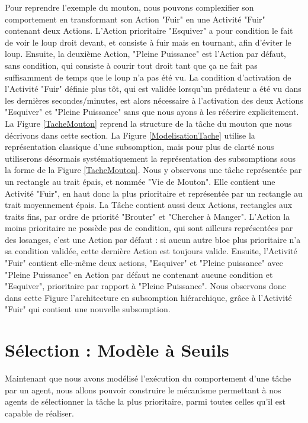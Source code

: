 			Pour reprendre l'exemple du mouton, nous pouvons complexifier son comportement en transformant son Action "Fuir" en une Activité "Fuir" contenant deux Actions. L'Action prioritaire "Esquiver" a pour condition le fait de voir le loup droit devant, et consiste à fuir mais en tournant, afin d'éviter le loup. Ensuite, la deuxième Action, "Pleine Puissance" est l'Action par défaut, sans condition, qui consiste à courir tout droit tant que ça ne fait pas suffisamment de temps que le loup n'a pas été vu. La condition d'activation de l'Activité "Fuir" définie plus tôt, qui est validée lorsqu'un prédateur a été vu dans les dernières secondes/minutes, est alors nécessaire à l'activation des deux Actions "Esquiver" et "Pleine Puissance" sans que nous ayons à les réécrire explicitement. La Figure \ref{TacheMouton} reprend la structure de la tâche du mouton que nous décrivons dans cette section. La Figure \ref{ModelisationTache} utilise la représentation classique d'une subsomption, mais pour plus de clarté nous utiliserons désormais systématiquement la représentation des subsomptions sous la forme de la Figure \ref{TacheMouton}. Nous y observons une tâche représentée par un rectangle au trait épais, et nommée "Vie de Mouton". Elle contient une Activité "Fuir", en haut donc la plus prioritaire et représentée par un rectangle au trait moyennement épais. La Tâche contient aussi deux Actions, rectangles aux traits fins, par ordre de priorité "Brouter" et "Chercher à Manger". L'Action la moins prioritaire ne possède pas de condition, qui sont ailleurs représentées par des losanges, c'est une Action par défaut : si aucun autre bloc plus prioritaire n'a sa condition validée, cette dernière Action est toujours valide. Ensuite, l'Activité "Fuir" contient elle-même deux actions, "Esquiver" et "Pleine puissance" avec "Pleine Puissance" en Action par défaut ne contenant aucune condition et "Esquiver", prioritaire par rapport à "Pleine Puissance". Nous observons donc dans cette Figure l'architecture en subsomption hiérarchique, grâce à l'Activité "Fuir" qui contient une nouvelle subsomption.
			
	
			
	\section{Sélection : Modèle à Seuils}
		Maintenant que nous avons modélisé l'exécution du comportement d'une tâche par un agent, nous allons pouvoir construire le mécanisme permettant à nos agents de sélectionner la tâche la plus prioritaire, parmi toutes celles qu'il est capable de réaliser.
		
